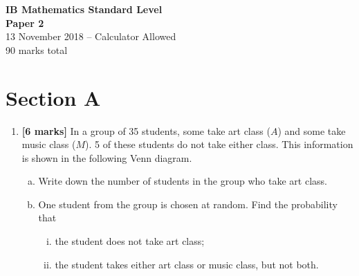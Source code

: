 \documentclass[12pt, twoside]{article}
\begin{document}
\begin{center}
\Large{\textbf{IB Mathematics Standard Level}} \\
\large{\textbf{Paper 2}} \\
\normalsize{13 November 2018 -- Calculator Allowed} \\
\normalsize{90 marks total}
\end{center}

\vspace{0.5cm}

\section*{Section A}

\begin{enumerate}

\item \textbf{[6 marks]} In a group of 35 students, some take art class ($A$) and some take music class ($M$). 5 of these students do not take either class. This information is shown in the following Venn diagram.

\begin{center}
\end{center}

\begin{enumerate}[(a)]
    \item Write down the number of students in the group who take art class.
    \item One student from the group is chosen at random. Find the probability that
    \begin{enumerate}[(i)]
        \item the student does not take art class;
        \item the student takes either art class or music class, but not both.
    \end{enumerate}
\end{enumerate}


\end{enumerate}
\end{document}
